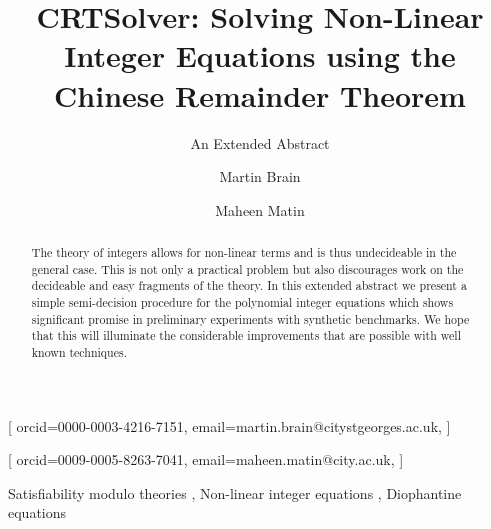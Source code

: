 \documentclass[
]{ceurart}
\begin{document}


\title{CRTSolver: Solving Non-Linear Integer Equations using the Chinese Remainder Theorem}
\subtitle{An Extended Abstract}


\author[1]{Martin Brain}[%
orcid=0000-0003-4216-7151,
email=martin.brain@citystgeorges.ac.uk,
]
\address[1]{City St. George's, University of London,
  Northampton Square, London, EC1V 0HB, United Kingdom}

\author[1]{Maheen Matin}[%
orcid=0009-0005-8263-7041,
email=maheen.matin@city.ac.uk,
]


\begin{abstract}
 The theory of integers allows for non-linear terms and is thus
 undecideable in the general case.
 This is not only a practical problem but also discourages work on
 the decideable and easy fragments of the theory.
 In this extended abstract we present a simple semi-decision procedure
 for the polynomial integer equations which shows significant promise
 in preliminary experiments with synthetic benchmarks.
 We hope that this will illuminate the considerable improvements that
 are possible with well known techniques.
\end{abstract}

\begin{keywords}
  Satisfiability modulo theories \sep
  Non-linear integer equations \sep
  Diophantine equations
\end{keywords}

\maketitle



\end{document}
